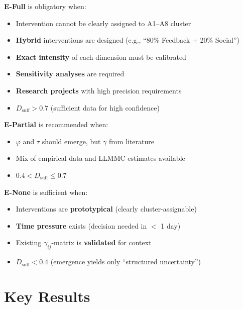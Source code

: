\begin{tcolorbox}[colback=green!5!white, colframe=green!75!black,
    title=\textbf{Mode Selection Criteria Summary}]

\textbf{E-Full} is obligatory when:
\begin{itemize}[nosep]
\item Intervention cannot be clearly assigned to A1--A8 cluster
\item \textbf{Hybrid} interventions are designed (e.g., ``80\% Feedback + 20\% Social'')
\item \textbf{Exact intensity} of each dimension must be calibrated
\item \textbf{Sensitivity analyses} are required
\item \textbf{Research projects} with high precision requirements
\item $D_{\text{suff}} > 0.7$ (sufficient data for high confidence)
\end{itemize}

\textbf{E-Partial} is recommended when:
\begin{itemize}[nosep]
\item $\varphi$ and $\tau$ should emerge, but $\gamma$ from literature
\item Mix of empirical data and LLMMC estimates available
\item $0.4 < D_{\text{suff}} \leq 0.7$
\end{itemize}

\textbf{E-None} is sufficient when:
\begin{itemize}[nosep]
\item Interventions are \textbf{prototypical} (clearly cluster-assignable)
\item \textbf{Time pressure} exists (decision needed in $<$ 1 day)
\item Existing $\gamma_{ij}$-matrix is \textbf{validated} for context
\item $D_{\text{suff}} < 0.4$ (emergence yields only ``structured uncertainty'')
\end{itemize}
\end{tcolorbox}



\section{Key Results}
\label{sec:results}

